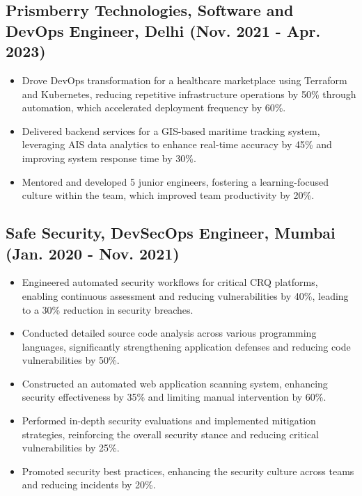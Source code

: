 \documentclass[a4paper,9pt]{article}
\begin{document}
\subsection*{Prismberry Technologies, Software and DevOps Engineer, Delhi (Nov. 2021 - Apr. 2023)}
\begin{itemize}
    \item Drove DevOps transformation for a healthcare marketplace using Terraform and Kubernetes, reducing repetitive infrastructure operations by 50\% through automation, which accelerated deployment frequency by 60\%.
    \item Delivered backend services for a GIS-based maritime tracking system, leveraging AIS data analytics to enhance real-time accuracy by 45\% and improving system response time by 30\%.
    \item Mentored and developed 5 junior engineers, fostering a learning-focused culture within the team, which improved team productivity by 20\%.
\end{itemize}

\subsection*{Safe Security, DevSecOps Engineer, Mumbai (Jan. 2020 - Nov. 2021)}
\begin{itemize}
    \item Engineered automated security workflows for critical CRQ platforms, enabling continuous assessment and reducing vulnerabilities by 40\%, leading to a 30\% reduction in security breaches.
    \item Conducted detailed source code analysis across various programming languages, significantly strengthening application defenses and reducing code vulnerabilities by 50\%.
    \item Constructed an automated web application scanning system, enhancing security effectiveness by 35\% and limiting manual intervention by 60\%.
    \item Performed in-depth security evaluations and implemented mitigation strategies, reinforcing the overall security stance and reducing critical vulnerabilities by 25\%.
    \item Promoted security best practices, enhancing the security culture across teams and reducing incidents by 20\%.
\end{itemize}
\end{document}
